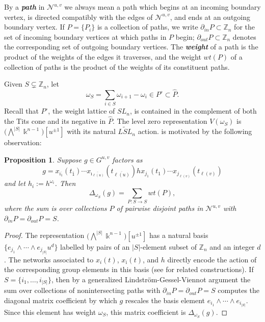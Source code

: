 \documentclass[12pt]{amsart}
\newcommand{\newword}[1]{\textbf{\emph{#1}}}
\newcommand{\ZZ}{\mathbb{Z}}
\newcommand{\kk}{\Bbbk}
\newcommand{\cN}{\mathcal{N}} %
\newcommand{\ol}[1]{\overline{#1}}
\newcommand{\loopvar}{u}
\newtheorem{proposition}[theorem]{Proposition}
\theoremstyle{remark}
\numberwithin{equation}{section}
\numberwithin{figure}{section}
\begin{document}
By a \newword{path} in $\cN^{u,v}$ we always mean a path which begins at an incoming boundary vertex, is directed compatibly with the edges of $\cN^{u,v}$, and ends at an outgoing boundary vertex.
If $P = \{P_i\}$ is a collection of paths, we write $\partial_{in}P \subset \ZZ_n$ for the set of incoming boundary vertices at which paths in $P$ begin; $\partial_{out}P \subset \ZZ_n$ denotes the corresponding set of outgoing boundary vertices.
The \newword{weight} of a path is the product of the weights of the edges it traverses, and the weight $wt(P)$ of a collection of paths is the product of the weights of its constituent paths.

Given $S \subsetneq \ZZ_n$, let
\[ 
  \omega_S 
  = 
  \sum_{i \in S} \omega_{i+1} - \omega_i \in P^\circ \subset \widehat{P}.
\] 
Recall that $P^\circ$, the weight lattice of $SL_n$, is contained in the complement of both the Tits cone and its negative in $\widehat{P}$.
The level zero representation $V(\omega_S)$ is $\big(\bigwedge^{|S|}\kk^{n-1}\big)[\loopvar^{\pm 1}]$ with its natural $\widetilde{LSL}_n$ action.
 is motivated by the following observation:

\begin{proposition}
  \label{prop:minorsfrompaths}
  Suppose $g\in G^{u,v}$ factors as
  \[
  g = x_{\ol{\imath_1}}(t_{\ol{1}})\cdots x_{\ol{\imath_{\ell(u)}}}(t_{\ol{\ell(u)}})hx_{j_1}(t_{1}) \cdots x_{j_{\ell(v)}}(t_{\ell(v)})
  \]
  and let $h_i:= h^{\omega_i}$.
  Then 
  \[ 
    \Delta_{\omega_S}(g) = \sum_{P: S \to S} wt(P), 
  \]
  where the sum is over collections $P$ of pairwise disjoint paths in $\cN^{u,v}$ with $\partial_{in}P = \partial_{out}P = S$.
\end{proposition}
\begin{proof}
  The representation $\big(\bigwedge^{|S|}\kk^{n-1}\big)[\loopvar^{\pm 1}]$ has a natural basis $\{ e_{j_1} \wedge \cdots \wedge e_{j_{|S|}} \loopvar^d\}$ labelled by pairs of an $|S|$-element subset of $\ZZ_n$ and an integer $d$.
  The networks associated to $x_i(t)$, $x_{\ol{\imath}}(t)$, and $h$ directly encode the action of the corresponding group elements in this basis (see \cite{GSV12,FM14} for related constructions).
  If $S = \{i_1,\dotsc,i_{|S|}\}$, then by a generalized Lindstr\"om-Gessel-Viennot argument the sum over collections of nonintersecting paths with $\partial_{in}P = \partial_{out}P = S$ computes the diagonal matrix coefficient by which $g$ rescales the basis element $e_{i_1} \wedge \cdots \wedge e_{i_{|S|}}$.
  Since this element has weight $\omega_S$, this matrix coefficient is $\Delta_{\omega_S}(g)$.
\end{proof}
\end{document}
